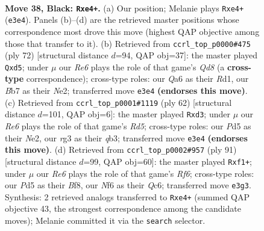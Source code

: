 \documentclass[11pt]{article}
\begin{document}
\clearpage

\begin{figure}[p]\centering
\begin{subfigure}{0.46\textwidth}\centering
\resizebox{\linewidth}{!}{%
\newchessgame
\chessboard[
  setfen={5k2/1b3p1P/qp3n2/1N1p4/P2PNK2/4r1R1/2Q5/7R b - - 0 38},
  showmover=false,
  pgfstyle=straightmove, color=movearrow, markmove={e3-e4}
]}
\caption{}
\end{subfigure}\hfill
\begin{subfigure}{0.46\textwidth}\centering
\resizebox{\linewidth}{!}{%
\newchessgame
\chessboard[
  setfen={3Q1nk1/2r2pp1/p6p/3np3/4PPB1/6PP/1q2N2K/3R4 w - - 2 37},
  showmover=false,
  pgfstyle=straightmove, color=movearrow, markmove={d8-d5}
]}
\caption{}
\end{subfigure}
\\[4pt]
\begin{subfigure}{0.46\textwidth}\centering
\resizebox{\linewidth}{!}{%
\newchessgame
\chessboard[
  setfen={8/2k1b2p/2n2p2/3RpP1Q/6P1/1q1rK3/4N1BP/8 w - - 0 32},
  showmover=false,
  pgfstyle=straightmove, color=movearrow, markmove={d5-d3}
]}
\caption{}
\end{subfigure}\hfill
\begin{subfigure}{0.46\textwidth}\centering
\resizebox{\linewidth}{!}{%
\newchessgame
\chessboard[
  setfen={5bk1/6p1/2q4p/2p1Q3/2PrN2P/5rP1/1P2R3/5RK1 b - - 3 46},
  showmover=false,
  pgfstyle=straightmove, color=movearrow, markmove={f3-f1}
]}
\caption{}
\end{subfigure}
\caption{\textbf{Move 38, Black: \texttt{Rxe4+}.} (a) Our position; Melanie plays \texttt{Rxe4+} (\texttt{e3e4}). Panels (b)--(d) are the retrieved master positions whose correspondence most drove this move (highest QAP objective among those that transfer to it). (b) Retrieved from \texttt{ccrl\_top\_p0000\#475} (ply 72) [structural distance $d$=94, QAP obj=37]: the master played \texttt{Qxd5}; under $\mu$ our \emph{Re6} plays the role of that game's \emph{Qd8} (a \textbf{cross-type} correspondence); cross-type roles: our \emph{Q}a6 as their \emph{R}d1, our \emph{B}b7 as their \emph{N}e2; transferred move \texttt{e3e4} \textbf{(endorses this move)}. (c) Retrieved from \texttt{ccrl\_top\_p0001\#1119} (ply 62) [structural distance $d$=101, QAP obj=6]: the master played \texttt{Rxd3}; under $\mu$ our \emph{Re6} plays the role of that game's \emph{Rd5}; cross-type roles: our \emph{P}d5 as their \emph{N}e2, our \emph{r}g3 as their \emph{q}b3; transferred move \texttt{e3e4} \textbf{(endorses this move)}. (d) Retrieved from \texttt{ccrl\_top\_p0002\#957} (ply 91) [structural distance $d$=99, QAP obj=60]: the master played \texttt{Rxf1+}; under $\mu$ our \emph{Re6} plays the role of that game's \emph{Rf6}; cross-type roles: our \emph{P}d5 as their \emph{B}f8, our \emph{N}f6 as their \emph{Q}c6; transferred move \texttt{e3g3}. Synthesis: 2 retrieved analogs transferred to \texttt{Rxe4+} (summed QAP objective 43, the strongest correspondence among the candidate moves); Melanie committed it via the \texttt{search} selector.}
\label{fig:thought-m75}
\end{figure}
\end{document}
